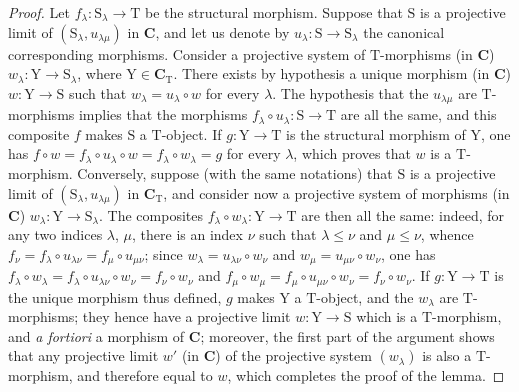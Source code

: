 \begin{proof}
Let $f_\lambda:\mathrm{S}_\lambda\to\mathrm{T}$ be the structural morphism.
Suppose that $\mathrm{S}$ is a projective limit of $(\mathrm{S}_\lambda,u_{\lambda\mu})$ in $\mathbf{C}$, and let us denote by $u_\lambda:\mathrm{S}\to\mathrm{S}_\lambda$ the canonical corresponding morphisms.
Consider a projective system of $\mathrm{T}$-morphisms (in $\mathbf{C}$) $w_\lambda:\mathrm{Y}\to\mathrm{S}_\lambda$, where $\mathrm{Y}\in\mathbf{C}_\mathrm{T}$.
There exists by hypothesis a unique morphism (in $\mathbf{C}$) $w:\mathrm{Y}\to\mathrm{S}$ such that $w_\lambda=u_\lambda\circ w$ for every $\lambda$.
The hypothesis that the $u_{\lambda\mu}$ are $\mathrm{T}$-morphisms implies that the morphisms $f_\lambda\circ u_\lambda:\mathrm{S}\to\mathrm{T}$ are all the same, and this composite $f$ makes $\mathrm{S}$ a $\mathrm{T}$-object.
If $g:\mathrm{Y}\to\mathrm{T}$ is the structural morphism of $\mathrm{Y}$, one has $f\circ w=f_\lambda\circ u_\lambda\circ w=f_\lambda\circ w_\lambda=g$ for every $\lambda$, which proves that $w$ is a $\mathrm{T}$-morphism.
Conversely, suppose (with the same notations) that $\mathrm{S}$ is a projective limit of $(\mathrm{S}_\lambda,u_{\lambda\mu})$ in $\mathbf{C}_\mathrm{T}$, and consider now a projective system of morphisms (in $\mathbf{C}$) $w_\lambda:\mathrm{Y}\to\mathrm{S}_\lambda$.
The composites $f_\lambda\circ w_\lambda:\mathrm{Y}\to\mathrm{T}$ are then all the same: indeed, for any two indices $\lambda$, $\mu$, there is an index $\nu$ such that $\lambda\leqslant\nu$ and $\mu\leqslant\nu$, whence $f_\nu=f_\lambda\circ u_{\lambda\nu}=f_\mu\circ u_{\mu\nu}$; since $w_\lambda=u_{\lambda\nu}\circ w_\nu$ and $w_\mu=u_{\mu\nu}\circ w_\nu$, one has $f_\lambda\circ w_\lambda=f_\lambda\circ u_{\lambda\nu}\circ w_\nu=f_\nu\circ w_\nu$ and $f_\mu\circ w_\mu=f_\mu\circ u_{\mu\nu}\circ w_\nu=f_\nu\circ w_\nu$.
If $g:\mathrm{Y}\to\mathrm{T}$ is the unique morphism thus defined, $g$ makes $\mathrm{Y}$ a $\mathrm{T}$-object, and the $w_\lambda$ are $\mathrm{T}$-morphisms; they hence have a projective limit $w:\mathrm{Y}\to\mathrm{S}$ which is a $\mathrm{T}$-morphism, and \emph{a fortiori} a morphism of $\mathbf{C}$; moreover, the first part of the argument shows that any projective limit $w'$ (in $\mathbf{C}$) of the projective system $(w_\lambda)$ is also a $\mathrm{T}$-morphism, and therefore equal to $w$, which completes the proof of the lemma.
\end{proof}

